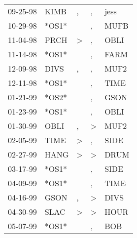 \begin{supertabular}{p{0.07\textwidth}p{0.06\textwidth}p{0.02\textwidth}p{0.02\textwidth}p{0.06\textwidth}}
 09-25-98\textsuperscript{} &           KIMB\textsuperscript{} &             , &             , &           jess\textsuperscript{} \\
 10-29-98\textsuperscript{} &                            *OS1* &               &             , &           MUFB\textsuperscript{} \\
 11-04-98\textsuperscript{} &           PRCH\textsuperscript{} &  \textgreater &             , &           OBLI\textsuperscript{} \\
 11-14-98\textsuperscript{} &                            *OS1* &               &             , &           FARM\textsuperscript{} \\
 12-09-98\textsuperscript{} &           DIVS\textsuperscript{} &             , &             , &           MUF2\textsuperscript{} \\
 12-11-98\textsuperscript{} &                            *OS1* &               &             , &           TIME\textsuperscript{} \\
 01-21-99\textsuperscript{} &                            *OS2* &               &             , &           GSON\textsuperscript{} \\
 01-23-99\textsuperscript{} &                            *OS1* &               &             , &           OBLI\textsuperscript{} \\
 01-30-99\textsuperscript{} &           OBLI\textsuperscript{} &             , &  \textgreater &           MUF2\textsuperscript{} \\
 02-05-99\textsuperscript{} &           TIME\textsuperscript{} &  \textgreater &             , &           SIDE\textsuperscript{} \\
 02-27-99\textsuperscript{} &           HANG\textsuperscript{} &  \textgreater &  \textgreater &           DRUM\textsuperscript{} \\
 03-17-99\textsuperscript{} &                            *OS1* &               &             , &           SIDE\textsuperscript{} \\
 04-09-99\textsuperscript{} &                            *OS1* &               &             , &           TIME\textsuperscript{} \\
 04-16-99\textsuperscript{} &           GSON\textsuperscript{} &             , &  \textgreater &           DIVS\textsuperscript{} \\
 04-30-99\textsuperscript{} &           SLAC\textsuperscript{} &  \textgreater &  \textgreater &           HOUR\textsuperscript{} \\
 05-07-99\textsuperscript{} &                            *OS1* &               &             , &            BOB\textsuperscript{} \\

\end{supertabular}
